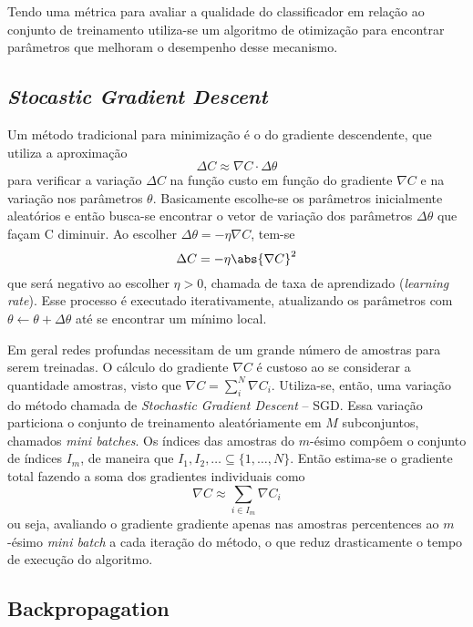 Tendo uma métrica para avaliar a qualidade do classificador em relação ao conjunto de treinamento utiliza-se um algoritmo de otimização para encontrar parâmetros que melhoram o desempenho desse mecanismo.

\subsection{\textit{Stocastic Gradient Descent}}
\label{sec:sgd}
Um método tradicional para minimização é o do gradiente descendente, que utiliza a aproximação
\begin{equation}
\Delta C \approx \nabla C \cdot \Delta \theta
\end{equation}
para verificar a variação $\Delta C$ na função custo em função do gradiente $\nabla C$ e na variação nos parâmetros $\theta$. Basicamente escolhe-se os parâmetros inicialmente aleatórios e então busca-se encontrar o vetor de variação dos parâmetros $\Delta \theta$ que façam C diminuir. Ao escolher $\Delta \theta = -\eta \nabla C$, tem-se
\begin{equation}
\Delta C = -\eta \abs{\nabla C}^2
\end{equation}
que será negativo ao escolher $\eta > 0$, chamada de taxa de aprendizado (\textit{learning rate}). Esse processo é executado iterativamente, atualizando os parâmetros com $\theta \gets \theta + \Delta \theta$ até se encontrar um mínimo local.

Em geral redes profundas necessitam de um grande número de amostras para serem treinadas. O cálculo do gradiente $\nabla C$ é custoso ao se considerar a quantidade amostras, visto que $\nabla C = \sum_i^N \nabla C_i$. Utiliza-se, então, uma variação do método chamada de \textit{Stochastic Gradient Descent} -- SGD. Essa variação particiona o conjunto de treinamento aleatóriamente em $M$ subconjuntos, chamados \textit{mini batches}. Os índices das amostras do $m$-ésimo  compôem o conjunto de índices $I_m$, de maneira que $I_1, I_2,\dots \subseteq \{1,\dots,N\}$. Então estima-se o gradiente total fazendo a soma dos gradientes individuais como
\begin{equation}
\nabla C \approx \sum_{i \in I_m} \nabla C_i
\end{equation}
ou seja, avaliando o gradiente gradiente apenas nas amostras percentences ao $m$-ésimo \textit{mini batch} a cada iteração do método, o que reduz drasticamente o tempo de execução do algoritmo.

\subsection{Backpropagation}
\label{sub-sec:backprop}

